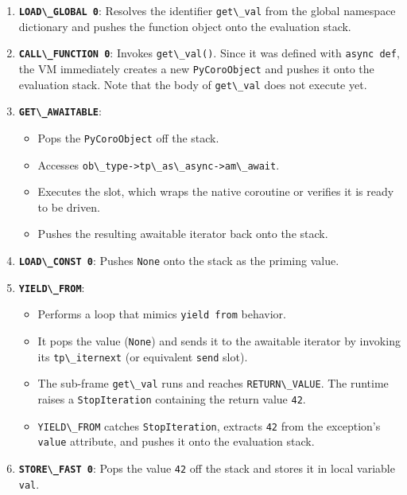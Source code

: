 \begin{enumerate}
\def\labelenumi{\arabic{enumi}.}
\tightlist
\item
  \textbf{\passthrough{\lstinline!LOAD\_GLOBAL 0!}}: Resolves the
  identifier \passthrough{\lstinline!get\_val!} from the global
  namespace dictionary and pushes the function object onto the
  evaluation stack.
\item
  \textbf{\passthrough{\lstinline!CALL\_FUNCTION 0!}}: Invokes
  \passthrough{\lstinline!get\_val()!}. Since it was defined with
  \passthrough{\lstinline!async def!}, the VM immediately creates a new
  \passthrough{\lstinline!PyCoroObject!} and pushes it onto the
  evaluation stack. Note that the body of
  \passthrough{\lstinline!get\_val!} does not execute yet.
\item
  \textbf{\passthrough{\lstinline!GET\_AWAITABLE!}}:

  \begin{itemize}
  \tightlist
  \item
    Pops the \passthrough{\lstinline!PyCoroObject!} off the stack.
  \item
    Accesses
    \passthrough{\lstinline!ob\_type->tp\_as\_async->am\_await!}.
  \item
    Executes the slot, which wraps the native coroutine or verifies it
    is ready to be driven.
  \item
    Pushes the resulting awaitable iterator back onto the stack.
  \end{itemize}
\item
  \textbf{\passthrough{\lstinline!LOAD\_CONST 0!}}: Pushes
  \passthrough{\lstinline!None!} onto the stack as the priming value.
\item
  \textbf{\passthrough{\lstinline!YIELD\_FROM!}}:

  \begin{itemize}
  \tightlist
  \item
    Performs a loop that mimics \passthrough{\lstinline!yield from!}
    behavior.
  \item
    It pops the value (\passthrough{\lstinline!None!}) and sends it to
    the awaitable iterator by invoking its
    \passthrough{\lstinline!tp\_iternext!} (or equivalent
    \passthrough{\lstinline!send!} slot).
  \item
    The sub-frame \passthrough{\lstinline!get\_val!} runs and reaches
    \passthrough{\lstinline!RETURN\_VALUE!}. The runtime raises a
    \passthrough{\lstinline!StopIteration!} containing the return value
    \passthrough{\lstinline!42!}.
  \item
    \passthrough{\lstinline!YIELD\_FROM!} catches
    \passthrough{\lstinline!StopIteration!}, extracts
    \passthrough{\lstinline!42!} from the exception's
    \passthrough{\lstinline!value!} attribute, and pushes it onto the
    evaluation stack.
  \end{itemize}
\item
  \textbf{\passthrough{\lstinline!STORE\_FAST 0!}}: Pops the value
  \passthrough{\lstinline!42!} off the stack and stores it in local
  variable \passthrough{\lstinline!val!}.
\end{enumerate}

